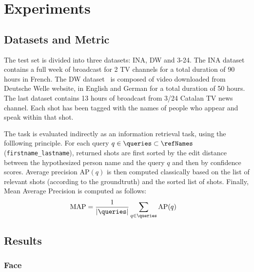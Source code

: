 \section{Experiments}
\label{sec:experiment}
%
\subsection{Datasets and Metric}

The test set is divided into three datasets: INA, DW and 3-24. The INA dataset contains a full week of broadcast for 2 TV channels for a total duration of 90 hours in French. The DW dataset~\cite{EUMSSI} is composed of video downloaded from Deutsche Welle website, in English and German for a total duration of 50 hours. The last dataset contains 13 hours of broadcast from 3/24 Catalan TV news channel. Each shot has been tagged with the names of people who appear and speak within that shot.

The task is evaluated indirectly as an information retrieval task, using the folllowing principle.
%
For each query $q \in \queries \subset \refNames$ (\texttt{first\-name\_lastname}), returned shots are first sorted by the edit distance between the hypothesized person name and the query $q$ and then by confidence scores.
Average precision $\text{AP}(q)$ is then computed classically based on the list of relevant shots (according to the groundtruth) and the sorted list of shots. Finally, Mean Average Precision is computed as follows:
\begin{align}
            \text{MAP} & = \frac{1}{|\queries|} \sum_{q \in \queries} \text{AP}(q) \nonumber
\end{align}

\subsection{Results}

\subsubsection{Face}

